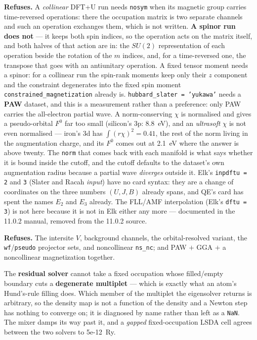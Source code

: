 \documentclass[11pt,a4paper]{article}
\newcommand{\code}[1]{\texttt{\small #1}}
\begin{document}
\begin{refuses}
\textbf{Refuses.} A \emph{collinear} DFT+U run needs \code{nosym} when its
magnetic group carries time-reversed operations: there the occupation matrix is
two separate channels and such an operation exchanges them, which is not
written. \textbf{A spinor run does not} --- it keeps both spin indices, so the
operation acts on the matrix itself, and both halves of that action are in: the
$SU(2)$ representation of each operation beside the rotation of the $m$ indices,
and, for a time-reversed one, the transpose that goes with an antiunitary
operation. A fixed tensor moment needs a spinor: for a collinear
run the spin-rank moments keep only their $z$ component and the constraint
degenerates into the fixed spin moment \code{constrained\_magnetization}
already is. \code{hubbard\_slater = 'yukawa'} needs a \textbf{PAW}
dataset, and this is a measurement rather than a preference: only PAW carries
the all-electron partial wave. A norm-conserving $\chi$ is normalised and gives
a pseudo-orbital $F^0$ far too small (silicon's 3p: 8.8~eV), and an
\emph{ultrasoft} $\chi$ is not even normalised --- iron's 3d has
$\int (r\chi)^2 = 0.41$, the rest of the norm living in the augmentation charge,
and its $F^0$ comes out at 2.1~eV where the answer is above twenty. The
\code{norm} that comes back with each manifold is what says whether it is bound
inside the cutoff, and the cutoff defaults to the dataset's own augmentation
radius because a partial wave \emph{diverges} outside it. Elk's
\code{inpdftu = 2} and \code{3} (Slater and Racah \emph{input}) have no card
syntax: they are a change of coordinates on the three numbers $(U, J, B)$
already spans, and QE's card has spent the names $E_2$ and $E_3$ already. The
FLL/AMF interpolation (Elk's \code{dftu = 3}) is not here because it is not in
Elk either any more --- documented in the 11.0.2 manual, removed from the 11.0.2
source.
\end{refuses}

\begin{refuses}
\textbf{Refuses.} The intersite $V$, background channels, the
orbital-resolved variant, the \code{wf}/\code{pseudo} projector sets, and
noncollinear \code{ns\_nc}; and PAW $+$ GGA $+$ a noncollinear magnetization
together.

The \textbf{residual solver} cannot take a fixed occupation whose filled/empty
boundary cuts a \textbf{degenerate multiplet} --- which is exactly what an
atom's Hund's-rule filling does. Which member of the multiplet the eigensolver
returns is arbitrary, so the density map is not a function of the density and a
Newton step has nothing to converge on; it is diagnosed by name rather than left
as a \code{NaN}. The mixer damps its way past it, and a \emph{gapped}
fixed-occupation LSDA cell agrees between the two solvers to 5e-12~Ry.
\end{refuses}
\end{document}
